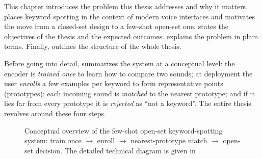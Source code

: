 \documentclass[12pt,a4paper]{report}
\begin{document}
This chapter introduces the problem this thesis addresses and why it matters.
 places keyword spotting in the context of modern voice
interfaces and motivates the move from a closed-set design to a few-shot open-set
one.  states the objectives of the thesis and
 the expected outcomes.  explains the problem
in plain terms. Finally,  outlines the structure of the
whole thesis.

Before going into detail,  summarizes the system at a
conceptual level: the encoder is \emph{trained once} to learn how to compare two
sounds; at deployment the user \emph{enrolls} a few
examples per keyword to form representative points (prototypes); each incoming
sound is \emph{matched} to the nearest prototype; and if it lies far from every
prototype it is \emph{rejected} as ``not a keyword''. The entire thesis revolves
around these four steps.

\begin{figure}[H]
\centering
{}
\caption{Conceptual overview of the few-shot open-set keyword-spotting system:
train once $\to$ enroll $\to$ nearest-prototype match $\to$ open-set decision.
The detailed technical diagram is given in .}
\label{fig:overview}
\end{figure}
\end{document}
